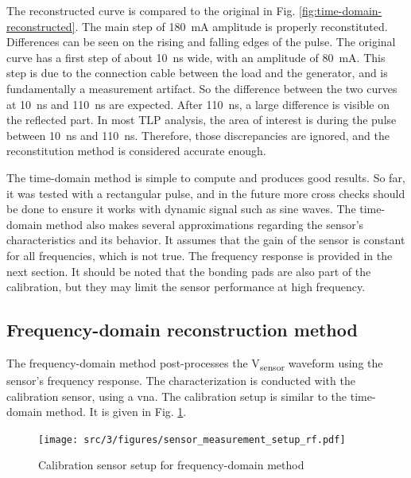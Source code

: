 The reconstructed curve is compared to the original in Fig. \ref{fig:time-domain-reconstructed}.
The main step of \SI{180}{\milli\ampere} amplitude is properly reconstituted.
Differences can be seen on the rising and falling edges of the pulse.
The original curve has a first step of about \SI{10}{\nano\second} wide, with an amplitude of \SI{80}{\milli\ampere}.
This step is due to the connection cable between the load and the generator, and is fundamentally a measurement artifact.
So the difference between the two curves at \SI{10}{\nano\second} and \SI{110}{\nano\second} are expected.
After \SI{110}{\nano\second}, a large difference is visible on the reflected part.
In most TLP analysis, the area of interest is during the pulse between \SI{10}{\nano\second} and \SI{110}{\nano\second}.
Therefore, those discrepancies are ignored, and the reconstitution method is considered accurate enough.

The time-domain method is simple to compute and produces good results.
So far, it was tested with a rectangular pulse, and in the future more cross checks should be done to ensure it works with dynamic signal such as sine waves.
The time-domain method also makes several approximations regarding the sensor's characteristics and its behavior.
It assumes that the gain of the sensor is constant for all frequencies, which is not true.
The frequency response is provided in the next section.
It should be noted that the bonding pads are also part of the calibration, but they may limit the sensor performance at high frequency.

\subsection{Frequency-domain reconstruction method}

The frequency-domain method post-processes the V\textsubscript{sensor} waveform using the sensor's frequency response.
The characterization is conducted with the calibration sensor, using a \gls{vna}.
The calibration setup is similar to the time-domain method.
It is given in Fig. \ref{fig:calibration-sensor-rf}.

\begin{figure}[!h]
  \centering
  \texttt{[image: src/3/figures/sensor\_measurement\_setup\_rf.pdf]}
  \caption{Calibration sensor setup for frequency-domain method}
  \label{fig:calibration-sensor-rf}
\end{figure}

